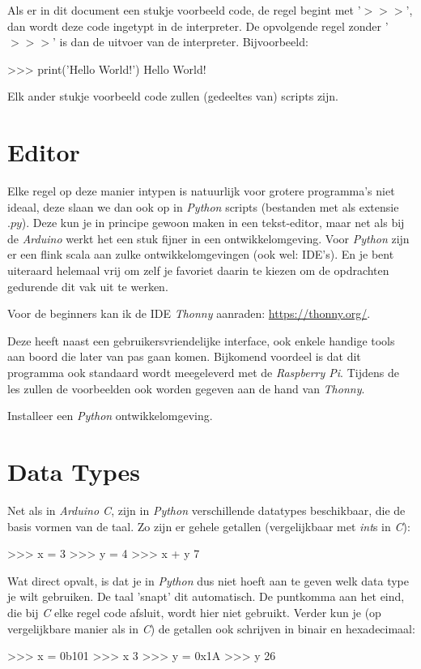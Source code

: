 \begin{remark}
Als er in dit document een stukje voorbeeld code, de regel begint met '$>>>$', dan wordt deze code ingetypt in de interpreter. De opvolgende regel zonder '$>>>$' is dan de uitvoer van de interpreter. Bijvoorbeeld:
\begin{python}
>>> print('Hello World!')
Hello World!
\end{python}
Elk ander stukje voorbeeld code zullen (gedeeltes van) scripts zijn. 
\end{remark}

\section{Editor}
Elke regel op deze manier intypen is natuurlijk voor grotere programma's niet ideaal, deze slaan we dan ook op in \textit{Python} scripts (bestanden met als extensie $.py$). Deze kun je in principe gewoon maken in een tekst-editor, maar net als bij de \textit{Arduino} werkt het een stuk fijner in een ontwikkelomgeving. Voor \textit{Python} zijn er een flink scala aan zulke ontwikkelomgevingen (ook wel: IDE's). En je bent uiteraard helemaal vrij om zelf je favoriet daarin te kiezen om de opdrachten gedurende dit vak uit te werken.\newline

Voor de beginners kan ik de IDE \textit{Thonny} aanraden: \url{https://thonny.org/}. \par 
Deze heeft naast een gebruikersvriendelijke interface, ook enkele handige tools aan boord die later van pas gaan komen. Bijkomend voordeel is dat dit programma ook standaard wordt meegeleverd met de \textit{Raspberry Pi}. Tijdens de les zullen de voorbeelden ook worden gegeven aan de hand van \textit{Thonny}.
\begin{exercise}
Installeer een \textit{Python} ontwikkelomgeving.
\end{exercise}

\section{Data Types}
Net als in \textit{Arduino C}, zijn in \textit{Python} verschillende datatypes beschikbaar, die de basis vormen van de taal. Zo zijn er gehele getallen (vergelijkbaar met \textit{int}s in \textit{C}):

\begin{python}
>>> x = 3
>>> y = 4
>>> x + y
7
\end{python}
Wat direct opvalt, is dat je in \textit{Python} dus niet hoeft aan te geven welk data type je wilt gebruiken. De taal 'snapt' dit automatisch. De puntkomma aan het eind, die bij \textit{C} elke regel code afsluit, wordt hier niet gebruikt. Verder kun je (op vergelijkbare manier als in \textit{C}) de getallen ook schrijven in binair en hexadecimaal:
\begin{python}
>>> x = 0b101
>>> x
3
>>> y = 0x1A
>>> y
26
\end{python}

